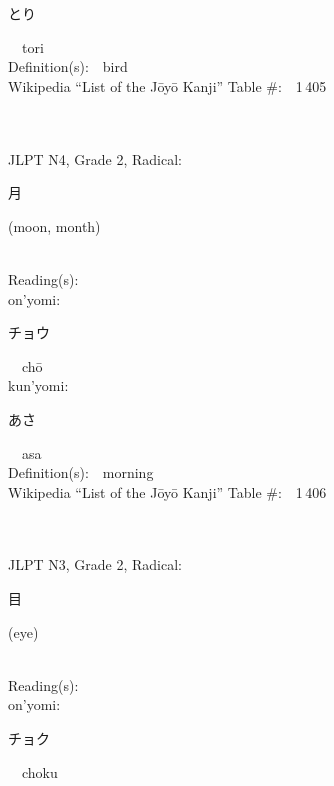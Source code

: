 \begin{multicols}{2}
{\hspace*{2em}}{\begin{CJK}{UTF8}{min} とり \end{CJK}}\ \ tori\ \ \\
Definition(s):\ \ bird \\
Wikipedia ``List of the J\=oy\=o Kanji'' Table \#:\ \ 1\,405 \\
\ \ \\
{\fontsize{34pt}{40pt}  }\ \ \\  %
{JLPT N4, Grade 2, Radical:\ \ {\begin{CJK}{UTF8}{min} 月 \end{CJK}} (moon, month) } \\
Reading(s):\ \ \\
{\hspace*{1em}}on'yomi:\ \ \\
{\hspace*{2em}}{\begin{CJK}{UTF8}{min} チョウ \end{CJK}}\ \ ch\=o\ \ \\
{\hspace*{1em}}kun'yomi:\ \ \\
{\hspace*{2em}}{\begin{CJK}{UTF8}{min} あさ \end{CJK}}\ \ asa\ \ \\
Definition(s):\ \ morning \\
Wikipedia ``List of the J\=oy\=o Kanji'' Table \#:\ \ 1\,406 \\
\ \ \\
{\fontsize{34pt}{40pt}  }\ \ \\  %
{JLPT N3, Grade 2, Radical:\ \ {\begin{CJK}{UTF8}{min} 目 \end{CJK}} (eye) } \\
Reading(s):\ \ \\
{\hspace*{1em}}on'yomi:\ \ \\
{\hspace*{2em}}{\begin{CJK}{UTF8}{min} チョク \end{CJK}}\ \ choku\ \ \\

\end{multicols}
